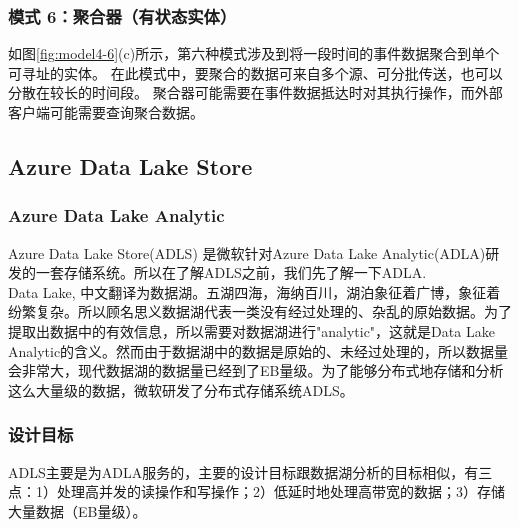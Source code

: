 \subsubsection{模式 6：聚合器（有状态实体）}
如图\ref{fig:model4-6}(c)所示，第六种模式涉及到将一段时间的事件数据聚合到单个可寻址的实体。 在此模式中，要聚合的数据可来自多个源、可分批传送，也可以分散在较长的时间段。 聚合器可能需要在事件数据抵达时对其执行操作，而外部客户端可能需要查询聚合数据。

\subsection{Azure Data Lake Store}
\subsubsection{Azure Data Lake Analytic}
Azure Data Lake Store(ADLS) 是微软针对Azure Data Lake Analytic(ADLA)研发的一套存储系统。所以在了解ADLS之前，我们先了解一下ADLA.\\
Data Lake, 中文翻译为数据湖。五湖四海，海纳百川，湖泊象征着广博，象征着纷繁复杂。所以顾名思义数据湖代表一类没有经过处理的、杂乱的原始数据。为了提取出数据中的有效信息，所以需要对数据湖进行"analytic"，这就是Data Lake Analytic的含义。然而由于数据湖中的数据是原始的、未经过处理的，所以数据量会非常大，现代数据湖的数据量已经到了EB量级。为了能够分布式地存储和分析这么大量级的数据，微软研发了分布式存储系统ADLS。
\subsubsection{设计目标}
ADLS主要是为ADLA服务的，主要的设计目标跟数据湖分析的目标相似，有三点：1）处理高并发的读操作和写操作；2）低延时地处理高带宽的数据；3）存储大量数据（EB量级）。
